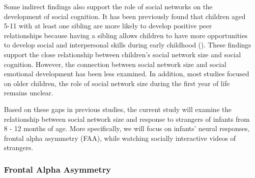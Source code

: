 \documentclass[
  man,
  floatsintext,
  longtable,
  nolmodern,
  notxfonts,
  notimes,
  colorlinks=true,linkcolor=blue,citecolor=blue,urlcolor=blue]{apa7}
\begin{document}
Some indirect findings also support the role of social networks on the
development of social cognition. It has been previously found that
children aged 5-11 with at least one sibling are more likely to develop
positive peer relationships because having a sibling allows children to
have more opportunities to develop social and interpersonal skills
during early childhood
().
These findings support the close relationship between children's social
network size and social cognition. However, the connection between
social network size and social emotional development has been less
examined. In addition, most studies focused on older children, the role
of social network size during the first year of life remains unclear.

Based on these gaps in previous studies, the current study will examine
the relationship between social network size and response to strangers
of infants from 8 - 12 months of age. More specifically, we will focus
on infants' neural responses, frontal alpha asymmetry (FAA), while
watching socially interactive videos of strangers.

\subsubsection{Frontal Alpha
Asymmetry}\label{sec-frontal-alpha-asymmetry}
\end{document}
